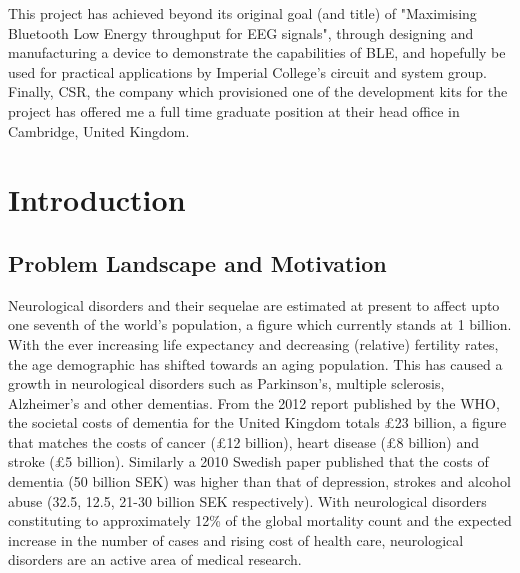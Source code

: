 \documentclass[]{article}
\begin{document}
This project has achieved beyond its original goal (and title) of "Maximising Bluetooth Low Energy throughput for \ac{EEG} signals", through designing and manufacturing a device to demonstrate the capabilities of \ac{BLE}, and hopefully be used for practical applications by Imperial College's circuit and system group. Finally, \ac{CSR}, the company which provisioned one of the development kits for the project has offered me a full time graduate position at their head office in Cambridge, United Kingdom.





\clearpage
\section{Introduction}

\subsection{Problem Landscape and Motivation}
Neurological disorders and their sequelae are estimated at present to affect upto one seventh of the world's population, a figure which currently stands at 1 billion. With the ever increasing life expectancy and decreasing (relative) fertility rates, the age demographic has shifted towards an aging population. This has caused a growth in neurological disorders such as Parkinson's, multiple sclerosis, Alzheimer's and other dementias. From the 2012 report published by the \ac{WHO}\cite{WorldHealthOrganization2012}, the societal costs of dementia for the United Kingdom totals £23 billion, a figure that matches the costs of cancer (£12 billion), heart disease (£8 billion) and stroke (£5 billion). Similarly a 2010 Swedish paper published that the costs of dementia (50 billion SEK) was higher than that of depression, strokes and alcohol abuse (32.5, 12.5, 21-30 billion SEK respectively)\cite{Wimo2010}. With neurological disorders constituting to approximately 12\% of the global mortality count\cite{WHO2006} and the expected increase in the number of cases and rising cost of health care, neurological disorders are an active area of medical research.
\end{document}
